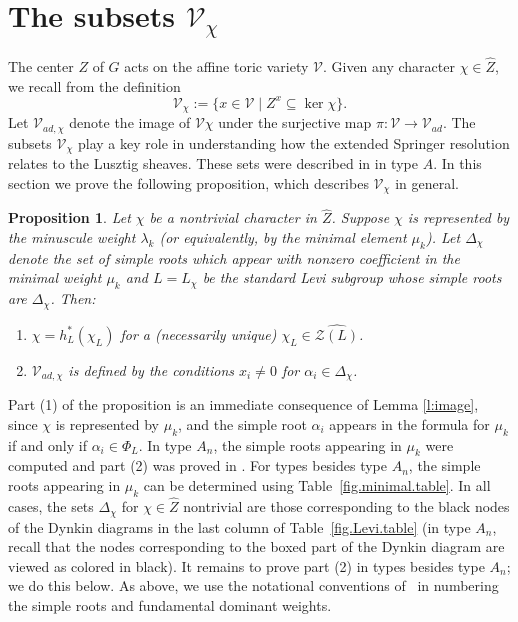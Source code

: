 \documentclass[reqno,11pt]{amsart}
\newtheorem{Prop}[Thm]{Proposition}
\theoremstyle{remark}
\theoremstyle{remark}
\theoremstyle{definition}
\theoremstyle{definition}
\theoremstyle{definition}
\numberwithin{equation}{section}
\renewcommand{\ker}{\operatorname{ker }}
\newcommand{\cz}{\mathcal{Z}}
\newcommand{\toric}{\mathcal{V}}
\renewcommand{\hat}{\widehat}
\begin{document}
\section{The subsets $\toric_\chi$}  \label{sec.toric_computation}
The center $Z$ of $G$ acts on the affine toric variety $\toric$. Given any character $\chi \in \widehat{Z}$, we recall from \cite{GPR23} the definition
\[
\toric_\chi := \{ x\in \toric\mid  Z^x \subseteq \ker \chi  \}. 
\]
Let $\toric_{ad, \chi}$ denote the image of $\toric{\chi}$ under the surjective map $\pi:\toric \to \toric_{ad}$. The subsets $\toric_\chi$ play a key role in understanding how the extended Springer resolution relates to the Lusztig sheaves.  These sets were described in \cite{GPR23} in type $A$.  In this section we prove the following proposition, which describes $\toric_{\chi}$ in general.  

\begin{Prop} \label{p:Levi-chi}
Let $\chi$ be a nontrivial character in $ \hat{Z}$.  Suppose $\chi$ is represented by the minuscule weight $\lambda_k$ (or equivalently, by the minimal element $\mu_k$). Let $\Delta_{\chi}$ denote the set of simple roots which appear with nonzero coefficient in the minimal weight $\mu_k$ and $L = L_{\chi}$ be the standard Levi subgroup whose simple roots are $\Delta_{\chi}$.  Then:
\begin{enumerate}
\item $\chi = h_L^*(\chi_L)$ for a (necessarily unique) $\chi_L \in \widehat{\cz(L)}$.
\item $\toric_{ad, \chi}$ is defined by the conditions $x_i \neq 0$ for $\alpha_i \in \Delta_{\chi}$.
\end{enumerate}
\end{Prop}


Part (1) of the proposition is an immediate consequence of Lemma \ref{l:image}, since $\chi$ is represented by $\mu_k$, and the simple root $\alpha_i$ appears in the formula for $\mu_k$ if and only if $\alpha_i \in \Phi_L$.  In type $A_n$, the simple roots appearing in $\mu_k$ were computed and part (2) was proved in \cite[\S 3.2]{GPR23}. For types besides type $A_n$, the simple roots appearing in $\mu_k$ can be determined using Table~\ref{fig.minimal.table}. In all cases, the sets $\Delta_\chi$ for $\chi\in \hat{Z}$ nontrivial are those corresponding to the black nodes of the Dynkin diagrams in the last column of Table~\ref{fig.Levi.table} (in type $A_n$, recall that the nodes corresponding to the boxed part of the Dynkin diagram are viewed as colored in black). It remains to prove part (2) in types besides type $A_n$; we do this below.   As above,
we use the notational conventions of~\cite{HumphreysLieAlg} in numbering the simple roots and fundamental dominant weights.  
  
\end{document}
